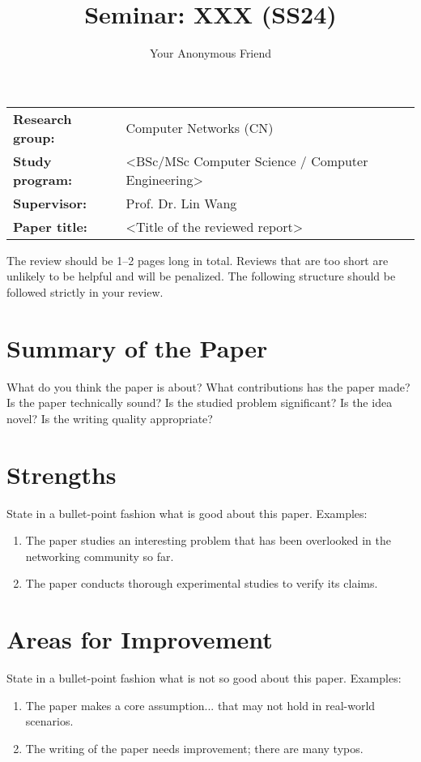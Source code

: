 \documentclass{upb-cn}
\title{Seminar: XXX (SS24)}
\author{Your Anonymous Friend}
\begin{document}
\makethetitle

\begin{notebox}
    \begin{tabular}{@{}ll}
        \textbf{Research group:} & Computer Networks (CN) \\
        \textbf{Study program:} & <BSc/MSc Computer Science / Computer Engineering> \\
        \textbf{Supervisor:} & Prof. Dr. Lin Wang \\
        \textbf{Paper title:} & <Title of the reviewed report>
    \end{tabular}
\end{notebox}

The review should be 1--2 pages long in total. Reviews that are too short are unlikely to be helpful and will be penalized. The following structure should be followed strictly in your review.

\section{Summary of the Paper}

What do you think the paper is about? What contributions has the paper made? Is the paper technically sound? Is the studied problem significant? Is the idea novel? Is the writing quality appropriate?


\section{Strengths}

State in a bullet-point fashion what is good about this paper. Examples:

\begin{enumerate}
    \item The paper studies an interesting problem that has been overlooked in the networking community so far.
    \item The paper conducts thorough experimental studies to verify its claims. 
\end{enumerate}

\section{Areas for Improvement}

State in a bullet-point fashion what is not so good about this paper. Examples:

\begin{enumerate}
    \item The paper makes a core assumption... that may not hold in real-world scenarios.
    \item The writing of the paper needs improvement; there are many typos.
\end{enumerate}
\end{document}
